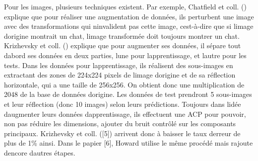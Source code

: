 \documentclass[11pt,final,ENIB]{sdm}
\begin{document}
{			Pour les images, plusieurs techniques existent. Par exemple, Chatfield et coll. (\cite{chatfield2014return}) explique que pour r\'ealiser une augmentation de donn\'ees, ils perturbent une image avec des transformations qui n\textquotesingle invalident pas cette image, c\textquotesingle est-\`a-dire que si l\textquotesingle image d\textquotesingle origine montrait un chat, l\textquotesingle image transform\'ee doit toujours montrer un chat. Krizhevsky et coll. (\cite{krizhevsky2012imagenet}) explique que pour augmenter ses donn\'ees, il s\'epare tout d\textquotesingle abord ses donn\'ees en deux parties, l\textquotesingle une pour l\textquotesingle apprentissage, et l\textquotesingle autre pour les tests. Dans les donn\'ees pour l\textquotesingle apprentissage, ils r\'ealisent des sous-images en extractant des zones de 224x224 pixels de l\textquotesingle image d\textquotesingle origine et de sa r\'eflection horizontale, qui a une taille de 256x256. On obtient donc une multiplication de 2048 de la base de donn\'ees d\textquotesingle origine. Les donn\'ees de test prendront 5 sous-images et leur r\'eflection (donc 10 images) selon leurs pr\'edictions. Toujours dans l\textquotesingle id\'ee d\textquotesingle augmenter leurs donn\'ees d\textquotesingle apprentissage, ils effectuent une ACP pour pouvoir, non pas r\'eduire les dimensions, ajouter du bruit contr\^ol\'e sur les composants principaux. Krizhevsky et coll. ([5]) arrivent donc \`a baisser le taux d\textquotesingle erreur de plus de 1\% ainsi. Dans le papier [6], Howard utilise le m\^eme proc\'ed\'e mais rajoute d\textquotesingle encore d\textquotesingle autres \'etapes. 

}
\end{document}

